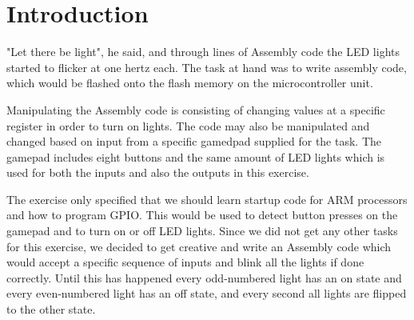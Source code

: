 \chapter{Introduction}
"Let there be light", he said, and through lines of Assembly code the LED lights started to flicker at one hertz each. The task at hand was to write assembly code, which would be flashed onto the flash memory on the microcontroller unit.

Manipulating the Assembly code is consisting of changing values at a specific register in order to turn on lights. The code may also be manipulated and changed based on input from a specific gamedpad supplied for the task. The gamepad includes eight buttons and the same amount of LED lights which is used for both the inputs and also the outputs in this exercise.

The exercise only specified that we should learn startup code for ARM processors and how to program GPIO. This would be used to detect button presses on the gamepad and to turn on or off LED lights. Since we did not get any other tasks for this exercise, we decided to get creative and write an Assembly code which would accept a specific sequence of inputs and blink all the lights if done correctly. Until this has happened every odd-numbered light has an on state and every even-numbered light has an off state, and every second all lights are flipped to the other state.